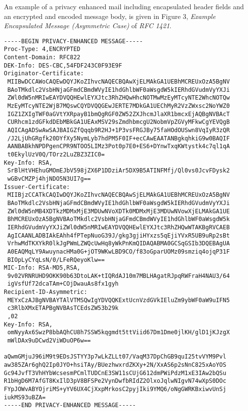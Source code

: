 An example of
a privacy enhanced mail including encapsulated header fields and an 
encrypted and encoded
message body, is given in Figure 3, {\em Example Encapsulated Message
(Asymmetric Case)} of {\em RFC 1421}.
{\small
\begin{verbatim}
-----BEGIN PRIVACY-ENHANCED MESSAGE-----
Proc-Type: 4,ENCRYPTED
Content-Domain: RFC822
DEK-Info: DES-CBC,54FDF243C0F93E9F
Originator-Certificate: 
 MIIBwDCCAWoCAQEwDQYJKoZIhvcNAQECBQAwXjELMAkGA1UEBhMCREUxOzA5BgNV
 BAoTMkdlc2VsbHNjaGFmdCBmdWVyIE1hdGhlbWF0aWsgdW5kIERhdGVudmVyYXJi
 ZWl0dW5nMRIwEAYDVQQHEwlEYXJtc3RhZHQwHhcNOTMwMzEyMTcyNTE2WhcNOTQw
 MzEyMTcyNTE2WjB7MQswCQYDVQQGEwJERTE7MDkGA1UEChMyR2VzZWxsc2NoYWZ0
 IGZ1ZXIgTWF0aGVtYXRpayB1bmQgRGF0ZW52ZXJhcmJlaXR1bmcxEjAQBgNVBAcT
 CURhcm1zdGFkdDEbMBkGA1UEAxMSV29sZmdhbmcgU2NobmVpZGVyMFkwCgYEVQgB
 AQICAgADSwAwSAJBAIGZfQqqb9R2HJ+1P3vsFRGJBy75faHOdOUSwn8VqIyR3zQR
 /J2LjUhGRgfk20DYfXy5NymLyb7hdPM5F0IF+ecCAwEAATANBgkqhkiG9w0BAQIF
 AANBABkhNPDPgenCPR9NTOO5LIMz3Pot0p7E0+ES6+DYnwTxqKWtystk4c7ql1qA
 t0EkylUzV0Q/TOrz2LuZBZ3ZIC0=
Key-Info: RSA,
 SrBlHtVHEhuGMOmEJbV598jZX6P1DDziAr5DX9B5ATINFMfj/Ql0vs0JcvFDysk2
 wGBvCMZPj4hjNDO5N3UI7g==
Issuer-Certificate: 
 MIIBjzCCATkCAQIwDQYJKoZIhvcNAQECBQAwSjELMAkGA1UEBhMCREUxOzA5BgNV
 BAoTMkdlc2VsbHNjaGFmdCBmdWVyIE1hdGhlbWF0aWsgdW5kIERhdGVudmVyYXJi
 ZWl0dW5nMB4XDTkzMDMxMjE3MDUwNVoXDTk0MDMxMjE3MDUwNVowXjELMAkGA1UE
 BhMCREUxOzA5BgNVBAoTMkdlc2VsbHNjaGFmdCBmdWVyIE1hdGhlbWF0aWsgdW5k
 IERhdGVudmVyYXJiZWl0dW5nMRIwEAYDVQQHEwlEYXJtc3RhZHQwWTAKBgRVCAEB
 AgICAANLADBIAkEAhh4fPTepNuoG39J/gkg3gjiHYxzs5qEjiYVxR5UB9uRp2sBt
 VrhwMdTKXYkR0lkJgPWmLZWQcUwHq8yWkPnKmQIDAQABMA0GCSqGSIb3DQEBAgUA
 A0EAQMqLY9AwuynacHMa0G+jOT9WKwLBD9CO/f83oGparUOMz09smziq4ojqP31F
 BIOpLyCYqLsN/0/LFeRQeyoKlw==
MIC-Info: RSA-MD5,RSA,
 9v02VRNRUHD9OKK90b63DtoLAK+tIQRdAJ10m7MBLHAgatRJpqRWFraH4NAU3/64
 igVsfUf72dcaTAm+COjDwauAs8fx1gyh
Recipient-ID-Asymmetric: 
 MEYxCzAJBgNVBAYTAlVTMSQwIgYDVQQKExtUcnVzdGVkIEluZm9ybWF0aW9uIFN5
 c3RlbXMxETAPBgNVBAsTCEdsZW53b29k
 ,02
Key-Info: RSA,
 omNyyAx6SwzP8bbAQhCU8h7SSW5kqgmdt5ttViid67Dm1Dme0jlKH/glD1jKJzgX
 mWlDAx9uDCwd2ViWDuOP6w==

aQwmGMjuJ96iM9t9EDsJSTYY3p7wLkZLLt07/VaqM37DpChGB9quI25tvVYM9Pvl
aw385ZAr6ghQ2Ip0JYO+hsiTAy/BUezhwxrdZKXy+2N/XxAS6p2sNnC825xAoYOS
Gc94JvfT3VhHYbWcsesmPCmlTUDCnE3SW11sCUjG612dmPWiPdzM1xE3IAw2bQSu
R1bHgD6M7AfGT8KxIlD3pV8BFSPe2VynDwfbRIdZ2OlxoJqlwNIgvN74wXpS0DOc
FYpJOWvABYOjriMS+yYV6UX4CjXxpMrkosC2pyjIki9YMQ6/oNgGWRKBxiwvUnSj
iukMS93uBZA=
-----END PRIVACY-ENHANCED MESSAGE-----
\end{verbatim}
}

